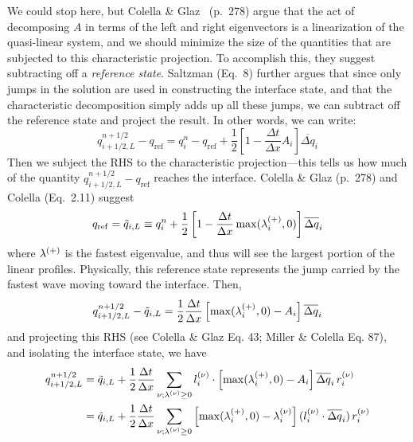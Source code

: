 We could stop here, but Colella \& Glaz~\cite{colellaglaz:1985}
(p.\ 278) argue that the act of decomposing $A$ in terms of the left
and right eigenvectors is a linearization of the quasi-linear system,
and we should minimize the size of the quantities that are subjected
to this characteristic projection.  To accomplish this, they suggest
subtracting off a {\em reference state}.  Saltzman (Eq.\ 8) further
argues that since only jumps in the solution are used in constructing
the interface state, and that the characteristic decomposition simply adds
up all these jumps, we can subtract off the reference state and
project the result.  In other words, we can write:
\begin{equation}
q_{i+1/2,L}^{n+1/2} - q_\mathrm{ref} = q_i^n - q_\mathrm{ref} +
  \frac{1}{2} \left [ 1 - \frac{\Delta t}{\Delta x} A_i \right ] \overline{\Delta q}_i
\label{eq:lin_decomp}
\end{equation}
Then we subject the RHS to the characteristic projection---this tells
us how much of the quantity $q_{i+1/2,L}^{n+1/2} - q_\mathrm{ref}$
reaches the interface.  Colella \& Glaz (p.\ 278) and Colella
(Eq.\ 2.11) suggest
\begin{equation}
q_\mathrm{ref} = \tilde{q}_{i,L} \equiv q_i^n +
   \frac{1}{2} \left [ 1 - \frac{\Delta t}{\Delta x}
 \max(\lambda_i^{(+)}, 0) \right ] \overline{\Delta q}_i \label{eq:qref}
\end{equation}
where $\lambda^{(+)}$ is the fastest eigenvalue, and thus will see
the largest portion of the linear profiles.  Physically, this
reference state represents the jump carried by the fastest wave
moving toward the interface.  Then,
\begin{equation}
q_{i+1/2,L}^{n+1/2} - \tilde{q}_{i,L} = \frac{1}{2} \frac{\Delta t}{\Delta x}
  \left [ \max(\lambda_i^{(+)},0) - A_i \right ] \overline{\Delta q}_i
\end{equation}
and projecting this RHS (see Colella \& Glaz Eq. 43; Miller \& Colella Eq. 87),
and isolating the interface state, we have
\begin{align}
q_{i+1/2,L}^{n+1/2} &= \tilde{q}_{i,L} + \frac{1}{2} \frac{\Delta t}{\Delta x}
       \sum_{\nu; \lambda^{(\nu)} \ge 0} l_i^{(\nu)} \cdot \left [ \max(\lambda_i^{(+)},0) - A_i \right ]
                                           \overline{\Delta q}_i \, r_i^{(\nu)} \\
                    &= \tilde{q}_{i,L} + \frac{1}{2} \frac{\Delta t}{\Delta x}
       \sum_{\nu; \lambda^{(\nu)} \ge 0} \left [ \max(\lambda_i^{(+)},0) - \lambda_i^{(\nu)} \right ]
                                          (l_i^{(\nu)} \cdot \overline{\Delta q}_i) \, r_i^{(\nu)}
\end{align}

